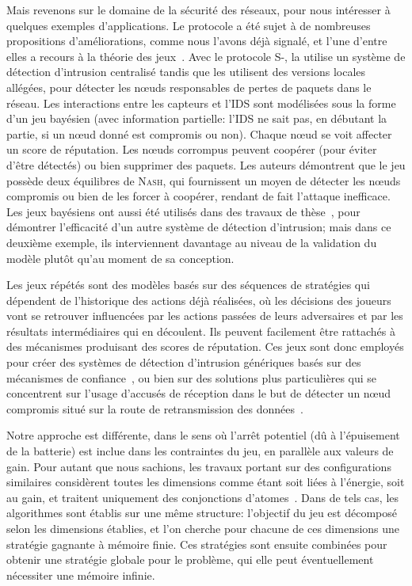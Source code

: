 Mais revenons sur le domaine de la sécurité des réseaux, pour nous intéresser à quelques exemples d'applications.
Le protocole \leach a été sujet à de nombreuses propositions d'améliorations, comme nous l'avons déjà signalé, et l'une d'entre elles a recours à la théorie des jeux~\cite{MMZ09}.
Avec le protocole S-\leach, la \sdb utilise un système de détection d'intrusion centralisé tandis que les \chs utilisent des versions locales allégées, pour détecter les nœuds responsables de pertes de paquets dans le réseau.
Les interactions entre les capteurs et l'IDS sont modélisées sous la forme d'un jeu bayésien (\cad avec information partielle: l'IDS ne sait pas, en débutant la partie, si un nœud donné est compromis ou non).
Chaque nœud se voit affecter un score de réputation.
Les nœuds corrompus peuvent coopérer (pour éviter d'être détectés) ou bien supprimer des paquets.
Les auteurs démontrent que le jeu possède deux équilibres de \textsc{Nash}, qui fournissent un moyen de détecter les nœuds compromis ou bien de les forcer à coopérer, rendant de fait l'attaque inefficace.
Les jeux bayésiens ont aussi été utilisés dans des travaux de thèse~\cite{Ham12}, pour démontrer l'efficacité d'un autre système de détection d'intrusion; mais dans ce deuxième exemple, ils interviennent davantage au niveau de la validation \aposteriori du modèle plutôt qu'au moment de sa conception.

Les jeux répétés sont des modèles basés sur des séquences de stratégies qui dépendent de l'historique des actions déjà réalisées, où les décisions des joueurs vont se retrouver influencées par les actions passées de leurs adversaires et par les résultats intermédiaires qui en découlent.
Ils peuvent facilement être rattachés à des mécanismes produisant des scores de réputation.
Ces jeux sont donc employés pour créer des systèmes de détection d'intrusion génériques basés sur des mécanismes de confiance~\cite{AD07}, ou bien sur des solutions plus particulières qui se concentrent sur l'usage d'accusés de réception dans le but de détecter un nœud compromis situé sur la route de retransmission des données~\cite{Red09}.

\bigskip
Notre approche est différente, dans le sens où l'arrêt potentiel (dû à l'épuisement de la batterie) est inclue dans les contraintes du jeu, en parallèle aux valeurs de gain.
Pour autant que nous sachions, les travaux portant sur des configurations similaires considèrent toutes les dimensions comme étant soit liées à l'énergie, soit au gain, et traitent uniquement des conjonctions d'atomes~\cite{chatterjee12,velner12a}.
Dans de tels cas, les algorithmes sont établis sur une même structure: l'objectif du jeu est décomposé selon les dimensions établies, et l'on cherche pour chacune de ces dimensions une stratégie gagnante à mémoire finie.
Ces stratégies sont ensuite combinées pour obtenir une stratégie globale pour le problème, qui elle peut éventuellement nécessiter une mémoire infinie.

